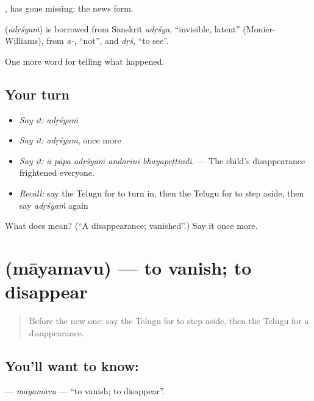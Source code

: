 , has gone missing: the news form.

\begin{cousinweb}
\textbf{} (\emph{adṛśyaṁ}) is borrowed from Sanskrit \emph{adṛśya}, \textquotedblleft{}invisible, latent\textquotedblright{} (Monier-Williams), from \emph{a-}, \textquotedblleft{}not\textquotedblright{}, and \emph{dṛś}, \textquotedblleft{}to see\textquotedblright{}.
\end{cousinweb}

\begin{grammarlens}[title={What you've built}]
One more word for telling what happened.
\end{grammarlens}

\subsection*{Your turn}
\begin{itemize}
\raggedright
  \item \emph{Say it:} \emph{adṛśyaṁ}
  \item \emph{Say it:} \emph{adṛśyaṁ}, once more
  \item \emph{Say it:} \emph{ā pāpa adṛśyaṁ andarinī bhayapeṭṭindi.} — The child's disappearance frightened everyone.
  \item \emph{Recall:} say the Telugu for to turn in, then the Telugu for to step aside, then say \emph{adṛśyaṁ} again
\end{itemize}

\begin{tcolorbox}[breakable,colback=teal!4,colframe=teal!35!black,title={Before you move on}]
What does  mean? (\textquotedblleft{}A disappearance; vanished\textquotedblright{}.) Say it once more.
\end{tcolorbox}
\section[\texorpdfstring{\te{మాయమవు} (māyamavu)}{మాయమవు (māyamavu)}]{ (māyamavu) — to vanish; to disappear}

\label{lesson:TE-C353-mayamavu}



\begin{quote}
Before the new one: say the Telugu for to step aside, then the Telugu for a disappearance.
\end{quote}

\subsection*{You'll want to know: }
\textbf{} — \emph{māyamavu} — \textquotedblleft{}to vanish; to disappear\textquotedblright{}.

